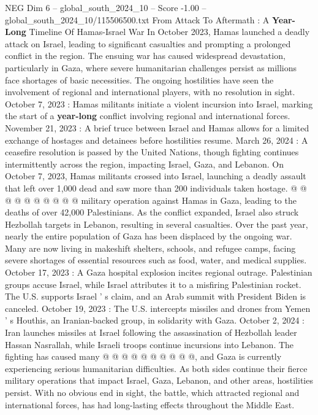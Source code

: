 \begin{textsample}{NEG Dim 6 – global\_south\_2024\_10 – Score -1.00 – global\_south\_2024\_10/115506500.txt}  \label{ex:f6_neg_031}
From Attack To Aftermath : A \textbf{Year-Long} Timeline Of Hamas-Israel War In October 2023, Hamas launched a deadly attack on Israel, leading to significant casualties and prompting a prolonged conflict in the region.
The ensuing war has caused widespread devastation, particularly in Gaza, where severe humanitarian challenges persist as millions face shortages of basic necessities.
The ongoing hostilities have seen the involvement of regional and international players, with no resolution in sight.
October 7, 2023 : Hamas militants initiate a violent incursion into Israel, marking the start of a \textbf{year-long} conflict involving regional and international forces.
November 21, 2023 : A brief truce between Israel and Hamas allows for a limited exchange of hostages and detainees before hostilities resume.
March 26, 2024 : A ceasefire resolution is passed by the United Nations, though fighting continues intermittently across the region, impacting Israel, Gaza, and Lebanon.
On October 7, 2023, Hamas militants crossed into Israel, launching a deadly assault that left over 1,000 dead and saw more than 200 individuals taken hostage. @ @ @ @ @ @ @ @ @ @ military operation against Hamas in Gaza, leading to the deaths of over 42,000 Palestinians.
As the conflict expanded, Israel also struck Hezbollah targets in Lebanon, resulting in several casualties.
Over the past year, nearly the entire population of Gaza has been displaced by the ongoing war.
Many are now living in makeshift shelters, schools, and refugee camps, facing severe shortages of essential resources such as food, water, and medical supplies.
October 17, 2023 : A Gaza hospital explosion incites regional outrage.
Palestinian groups accuse Israel, while Israel attributes it to a misfiring Palestinian rocket.
The U.S. supports Israel ' s claim, and an Arab summit with President Biden is canceled.
October 19, 2023 : The U.S. intercepts missiles and drones from Yemen ' s Houthis, an Iranian-backed group, in solidarity with Gaza.
October 2, 2024 : Iran launches missiles at Israel following the assassination of Hezbollah leader Hassan Nasrallah, while Israeli troops continue incursions into Lebanon.
The fighting has caused many @ @ @ @ @ @ @ @ @ @, and Gaza is currently experiencing serious humanitarian difficulties.
As both sides continue their fierce military operations that impact Israel, Gaza, Lebanon, and other areas, hostilities persist.
With no obvious end in sight, the battle, which attracted regional and international forces, has had long-lasting effects throughout the Middle East.

\end{textsample}
